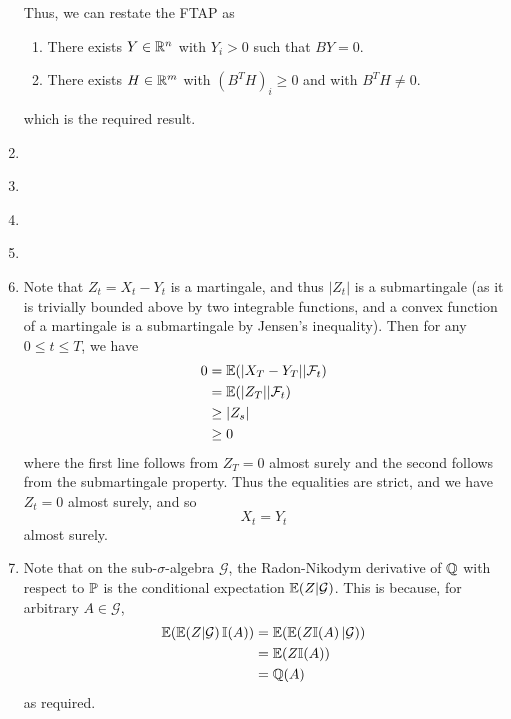 \begin{enumerate}
  Thus, we can restate the FTAP as
  \begin{enumerate}
  \item  There exists $Y \in \mathbb{R}^{n}$ with $Y_{i} > 0$ such that $BY
    = 0$.
  \item There exists $H \in \mathbb{R}^{m}$ with $(B^{T}H)_{i} \geq 0$ and
    with $B^{T} H \neq 0$. 
  \end{enumerate}
  which is the required result.
\item \label{item:7}
\item \label{item:8}
\item \label{item:9}
\item \label{item:10}
\item \label{item:11} Note that $Z_{t} = X_{t} - Y_{t}$ is a
  martingale, and thus $|Z_{t}|$ is a submartingale (as it is
  trivially bounded above by two integrable functions, and a convex
  function of a martingale is a submartingale by Jensen's inequality).
  Then for any $0 \leq t \leq T$, we have
  \begin{align}
    \label{eq:1}
    0 &= \E{|X_{T} - Y_{T}| | \mathcal{F}_{t}} \\
    &= \E{|Z_{T}| | \mathcal{F}_{t}} \\
    &\geq |Z_{s}| \\
    &\geq 0
  \end{align} where the first line follows from $Z_{T} = 0$ almost
  surely and the second follows from the submartingale property. Thus
  the equalities are strict, and we have $Z_{t} = 0$ almost surely,
  and so
  \begin{equation}
    \label{eq:3}
    X_{t} = Y_{t}
  \end{equation} almost surely.
\item \label{item:12}  Note that on the sub-$\sigma$-algebra
  $\mathcal{G}$, the Radon-Nikodym derivative of $\mathbb{Q}$ with respect to
  $\Prob$ is the conditional expectation $\E{Z|\mathcal{G}}$.  This is
  because, for arbitrary $A \in \mathcal{G}$,
  \begin{align}
    \label{eq:13}
    \E{\E{Z | \mathcal{G}} \I{A}} &= \E{\E{Z\I{A} | \mathcal{G}}} \\
    &= \E{Z\I{A}} \\
    &= \mathbb{Q}(A)
  \end{align} as required.


\end{enumerate}
